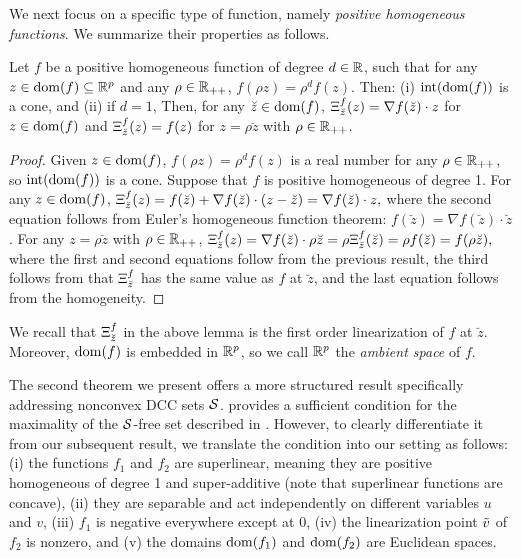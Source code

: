 We next focus on a specific type of function, namely  \emph{positive homogeneous functions}.  We summarize their properties as follows.
\begin{lemma}
	\label{lem.homo}
Let  $f$  be a positive homogeneous function of degree $d \in \mathbb R$, such that  for any $z \in \operatorname{dom}(f) \subseteq \mathbb R^p$ and any $\rho \in \mathbb R_{++}$, $f(\rho z)=\rho^d f(z)$. Then: (i) $\operatorname{int}(\operatorname{dom}(f))$ is a cone, and (ii) if $d=1$, Then, for any $\breve{z} \in \operatorname{dom}(f)$, \({\Xi^{f}_{\breve{z}}}(z) =\nabla  {f}(\breve{z})\cdot z\) for $z \in \operatorname{dom}(f)$ and \({\Xi^{f}_{\breve{z}}}(z)  = f(z)\) for \( z = \rho \breve{z}\) with \(\rho \in \mathbb R_{++}\).
\end{lemma}
\begin{proof}
Given $z \in \operatorname{dom}(f)$, $f(\rho z)= \rho^d f(z) $ is a real number for any  $\rho \in \mathbb R_{++}$, so $\operatorname{int}(\operatorname{dom}(f))$ is a cone.
Suppose that $f$ is positive homogeneous of degree 1. For any $z \in \operatorname{dom}(f)$,
$
	{\Xi^{f}_{\breve{z}}}(z) = f(\breve{z}) + \nabla  {f}(\breve{z}) \cdot (z - \breve{z}) =  \nabla  {f}(\breve{z}) \cdot z,
$
where  the second equation follows from Euler's homogeneous function theorem: $f(\breve{z}) = \nabla {f}(\breve{z}) \cdot \breve{z}$. For any \( z = \rho \breve{z}\) with \(\rho \in \mathbb R_{++}\),
$
	{\Xi^{f}_{\breve{z}}}(z)  = \nabla  {f}(\breve{z})\cdot \rho \breve{z} = \rho  {\Xi^{f}_{\breve{z}}}(\breve{z}) =\rho f( \breve{z}) = f(\rho \breve{z}),
$
where the first and second equations follow from the previous result, the third follows from that ${\Xi^{f}_{\breve{z}}}$ has the same value as $f$ at $\breve{z}$, and the last equation follows from the homogeneity.
\end{proof}

We recall that ${\Xi^{f}_{\breve{z}}}$ in the above lemma is the first order linearization of $f$ at $\breve{z}$. Moreover, $\operatorname{dom}(f)$ is embedded in $\mathbb R^p$, so we call $\mathbb R^p$ the \emph{ambient space} of $f$.


The second theorem we present offers a more structured result specifically addressing nonconvex DCC sets $\mathcal S$. \cite[Thm.~5.48]{serranothesis} provides a sufficient condition for the maximality of the $\mathcal S$-free set described in . However, to clearly differentiate it from our subsequent result, we translate the condition into our setting as follows: (i) the functions $f_1$ and $f_2$ are superlinear, meaning they are positive homogeneous of degree 1 and super-additive (note that superlinear functions are concave), (ii) they are separable and act independently on different variables $u$ and $v$, (iii) $f_1$ is negative everywhere except at 0, (iv) the linearization point $\tilde{v}$ of $f_2$ is nonzero, and (v) the domains $\operatorname{dom}(f_1)$ and $\operatorname{dom}(f_2)$ are Euclidean spaces.

